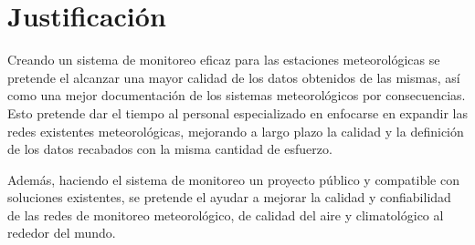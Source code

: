 \section{Justificación}

Creando un sistema de monitoreo eficaz para las estaciones meteorológicas se pretende el alcanzar una mayor calidad de los datos obtenidos de las mismas, así como una mejor documentación de los sistemas meteorológicos por consecuencias. Esto pretende dar el tiempo al personal especializado en enfocarse en expandir las redes existentes meteorológicas, mejorando a largo plazo la calidad y la definición de los datos recabados con la misma cantidad de esfuerzo.

Además, haciendo el sistema de monitoreo un proyecto público y compatible con soluciones existentes, se pretende el ayudar a mejorar la calidad y confiabilidad de las redes de monitoreo meteorológico, de calidad del aire y climatológico al rededor del mundo.
